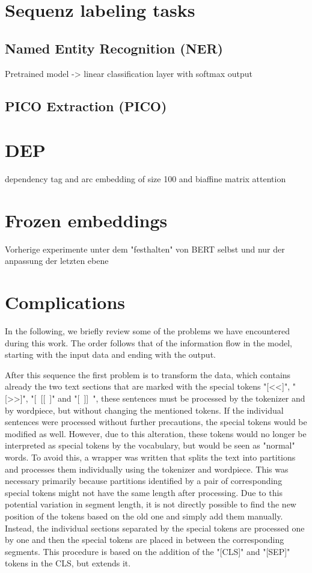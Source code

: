 \section{Sequenz labeling tasks}
\subsection{Named Entity Recognition (NER)}
\color{ForestGreen}
Pretrained model -> linear classification layer with softmax output
\color{black}
\subsection{PICO Extraction (PICO)}

\color{ForestGreen}
\section{DEP}
dependency  tag and arc embedding of size 100 and biaffine matrix attention 
\section{Frozen embeddings}
Vorherige experimente unter dem "festhalten" von BERT selbst und nur der anpassung der letzten ebene
\color{black}
\section{Complications}
\color{red}
In the following, we briefly review some of the problems we have encountered during this work. The order follows that of the information flow in the model, starting with the input data and ending with the output. 

After this sequence the first problem is to transform the data, which contains already the two text sections that are marked with the special tokens "[\textless\textless]", "[\textgreater\textgreater]", "[~[[~]" and "[~]]~", these sentences must be processed by the tokenizer and by wordpiece, but without changing the mentioned tokens. If the individual sentences were processed without further precautions, the special tokens would be modified as well. However, due to this alteration, these tokens would no longer be interpreted as special tokens by the vocabulary, but would be seen as "normal" words. To avoid this, a wrapper was written that splits the text into partitions and processes them individually using the tokenizer and wordpiece. This was necessary primarily because partitions identified by a pair of corresponding special tokens might not have the same length after processing. Due to this potential variation in segment length, it is not directly possible to find the new position of the tokens based on the old one and simply add them manually. Instead, the individual sections separated by the special tokens are processed one by one and then the special tokens are placed in between the corresponding segments. This procedure is based on the addition of the "[CLS]" and "[SEP]" tokens in the CLS, but extends it. 

